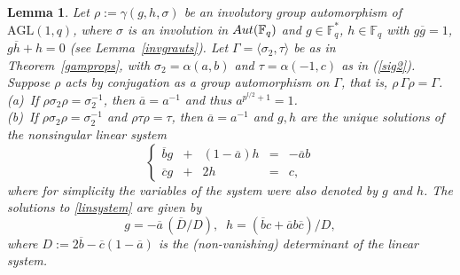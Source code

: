 \documentclass[10pt,a4paper]{amsart}
\newtheorem{lemma}{Lemma}
\begin{document}
\begin{lemma}
\label{conjlemma}
Let $\rho:=\gamma(g,h,\sigma)$ be an involutory group automorphism of $\mathrm{AGL}(1,q)$, where $\sigma$ is an involution in $\rm{Aut}(\mathbb{F}_q)$ and $g\in\mathbb{F}_q^*$, $h\in\mathbb{F}_q$ with $g\overline{g}= 1$, $g\overline{h}+h=0$ (see Lemma~\ref{invgrauts}). Let $\Gamma=\langle\sigma_2,\tau\rangle$ be as in Theorem~\ref{gamprops}, with $\sigma_{2}=\alpha(a,b)$ and $\tau=\alpha(-1,c)$ as in (\ref{sig2}). Suppose $\rho$ acts by conjugation as a group automorphism on $\Gamma$, that is, $\rho\,\Gamma\rho=\Gamma$. \\[.03in]
(a)\ If $\rho \sigma_2\rho = \sigma_2^{-1}$, then $\overline{a}=a^{-1}$ and thus $a^{p^{l/2} +1}=1$.\\[.03in]
(b)\ If $\rho \sigma_2\rho = \sigma_2^{-1}$ and $\rho\tau\rho=\tau$, then $\overline{a}=a^{-1}$ and $g,h$ are the unique solutions of the nonsingular linear system
\begin{equation}
\label{linsystem}
\left\{\begin{array}{rcrcr}
\overline{b} g &+& (1-\overline{a})h &=& -\overline{a}b \\
\overline{c} g &+& 2h &= &c,
\end{array}\right.
\end{equation}
where for simplicity the variables of the system were also denoted by $g$ and $h$. The solutions to \eqref{linsystem} are given by 
\begin{equation}
\label{systemsols}
g=-\overline{a}\,(\overline{D}/{D}),
\;\;h=(\overline{b}c+\overline{a}b\overline{c})/D,
\end{equation}
where $D:=2\overline{b}-\overline{c}(1-\overline{a})$ is the (non-vanishing) determinant of the linear system.
\end{lemma}
\end{document}
